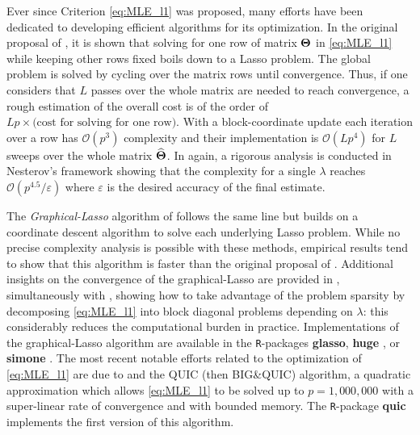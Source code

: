 Ever since Criterion \eqref{eq:MLE_l1} was proposed, many efforts have
been   dedicated   to   developing  efficient   algorithms   for   its
optimization. In  the original proposal  of \cite{2008_JMLR_Banerjee},
it  is  shown  that  solving  for  one  row  of  matrix  $\boldsymbol\Theta$  in
\eqref{eq:MLE_l1} while keeping other rows fixed boils down to a Lasso
problem.  The global problem is solved by cycling over the matrix rows
until convergence.   Thus, if one  considers that $L$ passes  over the
whole matrix  are needed to  reach convergence, a rough  estimation of
the  overall cost  is of  the  order of  $L p  \times \text{(cost  for
  solving  for  one  row)}$.   With  a  block-coordinate  update  each
iteration  over  a row  has  $\mathcal{O}(p^3)$  complexity and  their
implementation is $\mathcal{O}(L  p^4)$ for $L$ sweeps  over the whole
matrix  $\widehat{\boldsymbol\Theta}$.   In \cite{2008_JMLR_Banerjee}  again,  a
rigorous    analysis   is    conducted    in   Nesterov's    framework
\cite{nesterov2005smooth}  showing that  the complexity  for a  single
$\lambda$     reaches     $\mathcal{O}(p^{4.5}/\varepsilon)$     where
$\varepsilon$ is the desired accuracy of the final estimate.

The   \emph{Graphical-Lasso}   algorithm  of   \cite{2007_BS_Friedman}
follows the same line but builds  on a coordinate descent algorithm to
solve  each underlying  Lasso  problem.  While  no precise  complexity
analysis is  possible with  these methods,  empirical results  tend to
show  that this  algorithm is  faster  than the  original proposal  of
\cite{2008_JMLR_Banerjee}.  Additional insights  on the convergence of
the  graphical-Lasso  are  provided  in  \cite{mazumder2012graphical},
simultaneously   with  \cite{witten2011new},   showing  how   to  take
advantage  of the  problem sparsity  by decomposing  \eqref{eq:MLE_l1}
into block diagonal problems depending on $\lambda$: this considerably
reduces the computational burden  in practice.  Implementations of the
graphical-Lasso  algorithm are  available  in the  \texttt{R}-packages
\textbf{glasso},     \textbf{huge}    \cite{2014_huge_package},     or
\textbf{simone} \cite{simone,2009_BI_Chiquet}. The most recent notable
efforts related  to the optimization  of \eqref{eq:MLE_l1} are  due to
\cite{hsieh2014quic,NIPS2013_4923}  and  the   QUIC  (then  BIG\&QUIC)
algorithm, a quadratic approximation which allows \eqref{eq:MLE_l1} to
be solved up to $p=1,000,000$  with a super-linear rate of convergence
and  with   bounded  memory.   The   \texttt{R}-package  \textbf{quic}
implements the first version of this algorithm.

